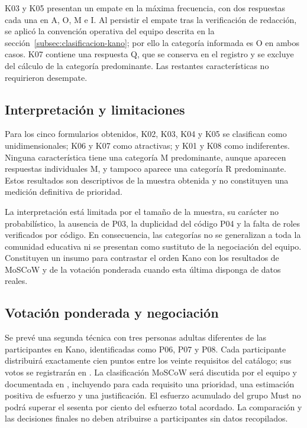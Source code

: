 K03 y K05 presentan un empate en la máxima frecuencia, con dos respuestas cada una en A, O, M e I. Al persistir el empate tras la verificación de redacción, se aplicó la convención operativa del equipo descrita en la sección~\ref{subsec:clasificacion-kano}; por ello la categoría informada es O en ambos casos. K07 contiene una respuesta Q, que se conserva en el registro y se excluye del cálculo de la categoría predominante. Las restantes características no requirieron desempate.

\subsection{Interpretación y limitaciones}
\label{subsec:interpretacion-kano}

Para los cinco formularios obtenidos, K02, K03, K04 y K05 se clasifican como unidimensionales; K06 y K07 como atractivas; y K01 y K08 como indiferentes. Ninguna característica tiene una categoría M predominante, aunque aparecen respuestas individuales M, y tampoco aparece una categoría R predominante. Estos resultados son descriptivos de la muestra obtenida y no constituyen una medición definitiva de prioridad.

La interpretación está limitada por el tamaño de la muestra, su carácter no probabilístico, la ausencia de P03, la duplicidad del código P04 y la falta de roles verificados por código. En consecuencia, las categorías no se generalizan a toda la comunidad educativa ni se presentan como sustituto de la negociación del equipo. Constituyen un insumo para contrastar el orden Kano con los resultados de MoSCoW y de la votación ponderada cuando esta última disponga de datos reales.

\subsection{Votación ponderada y negociación}

Se prevé una segunda técnica con tres personas adultas diferentes de las participantes en Kano, identificadas como P06, P07 y P08. Cada participante distribuirá exactamente cien puntos entre los veinte requisitos del catálogo; sus votos se registrarán en . La clasificación MoSCoW será discutida por el equipo y documentada en , incluyendo para cada requisito una prioridad, una estimación positiva de esfuerzo y una justificación. El esfuerzo acumulado del grupo Must no podrá superar el sesenta por ciento del esfuerzo total acordado. La comparación y las decisiones finales no deben atribuirse a participantes sin datos recopilados.

